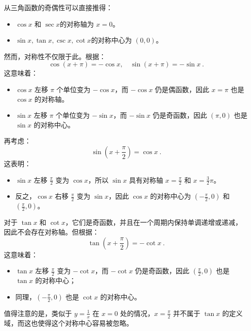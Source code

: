 从三角函数的奇偶性可以直接推得：
\begin{itemize}
\item $\cos x$ 和 $\sec x$的对称轴为 $x=0$。
\item $\sin x,\tan x,\csc x,\cot x$的对称中心为 $(0,0)$。
\end{itemize}
然而，对称性不仅限于此。根据：
\begin{equation}
\cos(x+\pi) = -\cos x,\quad\sin(x+\pi) = -\sin x~.
\end{equation}
这意味着：
\begin{itemize}
\item $\cos x$ 左移 $\pi$ 个单位变为 $-\cos x$，而 $-\cos x$ 仍是偶函数，因此 $x=\pi$ 也是 $\cos x$ 的对称轴。
\item $\sin x$ 左移 $\pi$ 个单位变为 $-\sin x$，而 $-\sin x$ 仍是奇函数，因此 $(\pi,0)$ 也是 $\sin x$ 的对称中心。
\end{itemize}

再考虑：
\begin{equation}
\sin(x+\frac{\pi}{2}) = \cos x~.
\end{equation}
这表明：
\begin{itemize}
\item $\sin x$ 左移 $\displaystyle\frac{\pi}{2}$ 变为 $\cos x$，所以 $\sin x$ 具有对称轴 $\displaystyle x=\frac{\pi}{2}$ 和 $\displaystyle x=\frac{3}{2}\pi$。
\item 反之，$\cos x$ 右移 $\displaystyle\frac{\pi}{2}$ 变为 $\sin x$，因此 $\cos x$ 的对称中心为 $\displaystyle\left(-\frac{\pi}{2},0\right)$ 和 $\displaystyle\left(\frac{\pi}{2},0\right)$。
\end{itemize} 

对于 $\tan x$ 和 $\cot x$，它们是奇函数，并且在一个周期内保持单调递增或递减，因此不会存在对称轴。但根据：
\begin{equation}
\tan(x+\frac{\pi}{2}) = -\cot x~.
\end{equation}
这意味着：
\begin{itemize}
\item $\tan x$ 左移 $\displaystyle\frac{\pi}{2}$ 变为 $-\cot x$，而 $-\cot x$ 仍是奇函数，因此 $\displaystyle\left(\frac{\pi}{2},0\right)$ 也是 $\tan x$ 的对称中心；
\item 同理，$\displaystyle\left(-\frac{\pi}{2},0\right)$ 也是 $\cot x$ 的对称中心。
\end{itemize}
值得注意的是，类似于 $\displaystyle y=\frac{1}{x}$ 在 $x=0$ 处的情况，$\displaystyle x=\frac{\pi}{2}$ 并不属于 $\tan x$ 的定义域，而这也使得这个对称中心容易被忽略。

